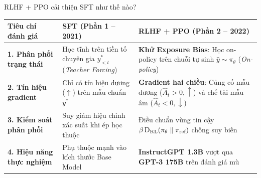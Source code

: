 \begin{frame}{RLHF + PPO cải thiện SFT như thế nào?}
  \vspace{0.05cm}
  \footnotesize
  \renewcommand{\arraystretch}{1.20}
  \begin{tabularx}{\textwidth}{@{}p{3.4cm} X X@{}}
    \toprule
    \textbf{Tiêu chí đánh giá} & \textbf{SFT (Phần 1 -- 2021)} & \textbf{RLHF + PPO (Phần 2 -- 2022)} \\
    \midrule
    \textbf{1. Phân phối trạng thái} & Học tĩnh trên tiền tố chuyên gia $y_{<t}^*$ (\textit{Teacher Forcing}) & \textbf{\textcolor{tealgreen}{Khử Exposure Bias}}: Học on-policy trên chuỗi tự sinh $\hat{y} \sim \pi_\theta$ (\textit{On-policy}) \\

    \textbf{2. Tín hiệu gradient} & Chỉ có tín hiệu dương ($\uparrow$) trên mẫu chuẩn $y^*$ & \textbf{\textcolor{tealgreen}{Gradient hai chiều}}: Củng cố mẫu dương ($\hat{A}_t > 0, \uparrow$) và chế tài mẫu âm ($\hat{A}_t < 0, \downarrow$) \\

    \textbf{3. Kiểm soát phân phối} & Suy giảm hiệu chỉnh xác suất khi ép học thuộc & Điều chuẩn vùng tin cậy $\beta\operatorname{D_{\mathrm{KL}}}(\pi_\theta \parallel \pi_{\text{ref}})$ chống suy biến \\

    \textbf{4. Hiệu năng thực nghiệm} & Phụ thuộc mạnh vào kích thước Base Model & \textbf{InstructGPT 1.3B} vượt qua \textbf{GPT-3 175B} trên đánh giá mù \\
    \bottomrule
  \end{tabularx}
  \par\vspace{0pt}
\end{frame}

